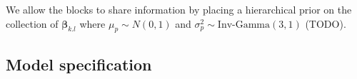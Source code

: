 \documentclass{article}
\begin{document}
We allow the blocks to share information by placing a hierarchical prior on the collection of $\boldsymbol{\beta}_{k.l}$ where $\mu_p \sim N(0,1)$ and $\sigma_p^2 \sim \mbox{Inv-Gamma}(3,1)$ (TODO). 

\subsection{Model specification}
  
\end{document}
